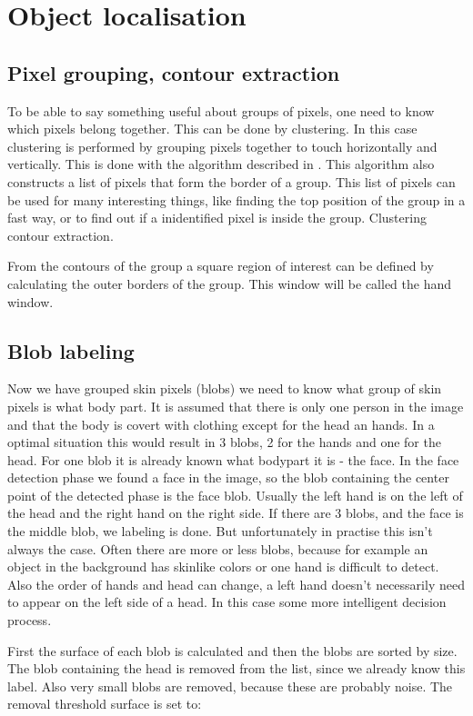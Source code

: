 \section{Object localisation}

\subsection*{Pixel grouping, contour extraction}
To be able to say something useful about groups of pixels, one need to know which pixels belong together. This can be done by clustering. In this case clustering is performed by grouping pixels together to touch horizontally and vertically. This is done with the algorithm described in \cite{Suzuki85}. This algorithm also constructs a list of pixels that form the border of a group. This list of pixels can be used for many interesting things, like finding the top position of the group in a fast way, or to find out if a inidentified pixel is inside the group. Clustering contour extraction\cite{Suzuki85}.

From the contours of the group a square region of interest can be defined by calculating the outer borders of the group. This window will be called the hand window.

\subsection*{Blob labeling}
Now we have grouped skin pixels (blobs) we need to know what group of skin pixels is what body part. It is assumed that there is only one person in the image and that the body is covert with clothing except for the head an hands. In a optimal situation this would result in 3 blobs, 2 for the hands and one for the head. For one blob it is already known what bodypart it is - the face. In the face detection phase we found a face in the image, so the blob containing the center point of the detected phase is the face blob. Usually the left hand is on the left of the head and the right hand on the right side. If there are 3 blobs, and the face is the middle blob, we labeling is done. But unfortunately in practise this isn't always the case. Often there are more or less blobs, because for example an object in the background has skinlike colors or one hand is difficult to detect. Also the order of hands and head can change, a left hand doesn't necessarily need to appear on the left side of a head. In this case some more intelligent decision process. 

First the surface of each blob is calculated and then the blobs are sorted by size. The blob containing the head is removed from the list, since we already know this label. Also very small blobs are removed, because these are probably noise. The removal threshold surface is set to:

